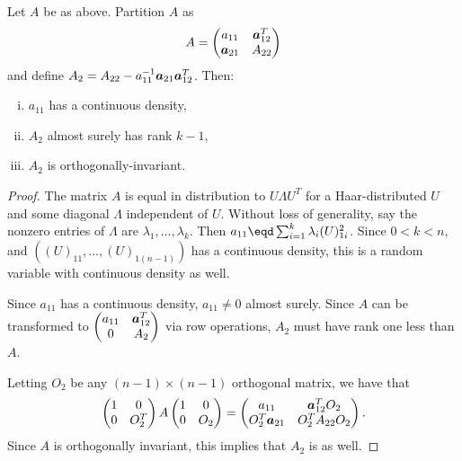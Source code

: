 \begin{lemma}
    Let $A$ be as above.  Partition $A$ as 
    \[
        A
        =
        \left(
        \begin{matrix}
            a_{11}   & \boldsymbol{a}_{12}^T \\
            \boldsymbol{a}_{21} & A_{22}
        \end{matrix}
        \right)
    \]
    and define $A_2 = A_{22} - a_{11}^{-1} \boldsymbol{a}_{21} \boldsymbol{a}_{12}^T$.  Then:
    \begin{enumerate}[(i)]
        \item $a_{11}$ has a continuous density,
        \item $A_2$ almost surely has rank $k-1$,
        \item $A_2$ is orthogonally-invariant.
    \end{enumerate}
\end{lemma}
\begin{proof}
    The matrix $A$ is equal in distribution to $U \Lambda U^T$ for a
    Haar-distributed $U$ and some diagonal $\Lambda$ independent of $U$.  
    Without loss of generality, say the nonzero entries of $\Lambda$ are
    $\lambda_{1}, \ldots, \lambda_k$.  Then 
    $a_{11} \eqd \sum_{i=1}^k \lambda_i (U)_{1i}^2$.  Since $0 < k < n$, 
    and $((U)_{11}, \ldots, (U)_{1(n-1)})$ has a continuous density, this is a
    random variable with continuous density as well.
    
    Since $a_{11}$ has a continuous density, $a_{11} \neq 0$ almost surely.
    Since $A$ can be transformed to
    \(
        \left(
        \begin{matrix}
            a_{11} & \boldsymbol{a}_{12}^T \\
            0      & A_2
        \end{matrix}
        \right)
    \)
    via row operations, $A_2$ must have rank one less than $A$.
    
    Letting $O_2$ be any $(n-1)\times(n-1)$ orthogonal matrix, we have
    that
    \[
        \left(
        \begin{matrix}
            1 & 0 \\
            0 & O_2^T
        \end{matrix}
        \right)
        A
        \left(
        \begin{matrix}
            1 & 0 \\
            0 & O_2
        \end{matrix}
        \right)
        =
        \left(
        \begin{matrix}
            a_{11}   & \boldsymbol{a}_{12}^T O_2 \\
            O_2^T \boldsymbol{a}_{21} & O_2^T A_{22} O_2
        \end{matrix}
        \right).
    \]
    Since $A$ is orthogonally invariant, this implies that $A_2$ is
    as well.
\end{proof}

